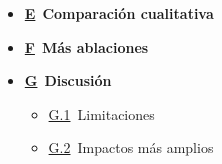 \documentclass{article}
\begin{document}
\begin{itemize}
    \item \hyperref[app:sec:Qualitative_Comparison]{\textbf{E}}~\textbf{Comparación cualitativa}

    \item \hyperref[app:sec:More_Ablations]{\textbf{F}}~\textbf{Más ablaciones}

    \item \hyperref[app:sec:Discussions]{\textbf{G}}~\textbf{Discusión}
    \begin{itemize}
        \item \hyperref[app:sec:Discussions:Limitations]{G.1}~Limitaciones
        \item \hyperref[app:sec:Discussions:Broader Impacts]{G.2}~Impactos más amplios
    \end{itemize}
\end{itemize}


\newpage





\clearpage
{
\small


}
\end{document}
